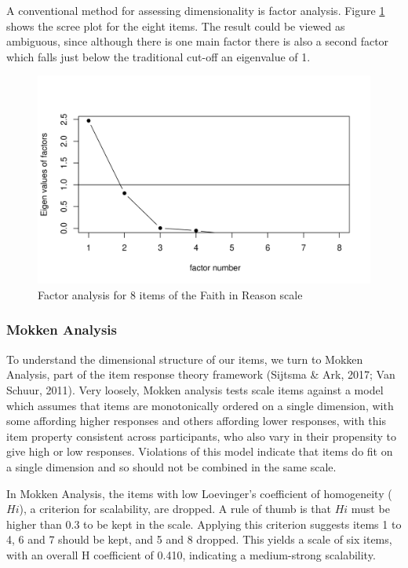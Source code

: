 \documentclass[
  ,jou,floatsintext]{apa6}
\begin{document}
A conventional method for assessing dimensionality is factor analysis. Figure \ref{fig:factor8} shows the scree plot for the eight items. The result could be viewed as ambiguous, since although there is one main factor there is also a second factor which falls just below the traditional cut-off an eigenvalue of 1.

\begin{figure}

{\centering \includegraphics[width=1\linewidth]{plots/reason_scree8} 

}

\caption{Factor analysis for 8 items of the Faith in Reason scale}\label{fig:factor8}
\end{figure}

\hypertarget{mokken-analysis}{%
\subsubsection{Mokken Analysis}\label{mokken-analysis}}

To understand the dimensional structure of our items, we turn to Mokken Analysis, part of the item response theory framework (Sijtsma \& Ark, 2017; Van Schuur, 2011). Very loosely, Mokken analysis tests scale items against a model which assumes that items are monotonically ordered on a single dimension, with some affording higher responses and others affording lower responses, with this item property consistent across participants, who also vary in their propensity to give high or low responses. Violations of this model indicate that items do fit on a single dimension and so should not be combined in the same scale.

In Mokken Analysis, the items with low Loevinger's coefficient of homogeneity (\(H i\)), a criterion for scalability, are dropped. A rule of thumb is that \(H i\) must be higher than 0.3 to be kept in the scale. Applying this criterion suggests items 1 to 4, 6 and 7 should be kept, and 5 and 8 dropped. This yields a scale of six items, with an overall H coefficient of 0.410, indicating a medium-strong scalability.
\end{document}
